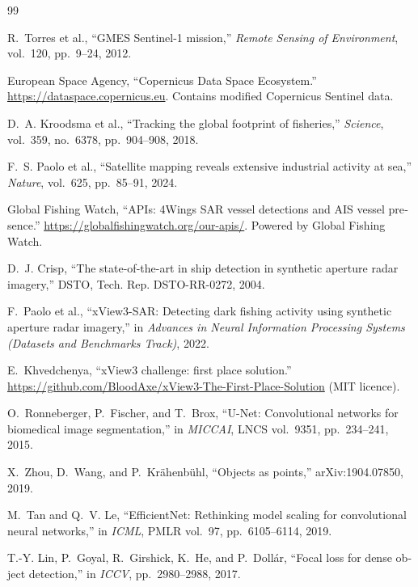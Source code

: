 \renewcommand{\bibname}{مراجع}
\begin{thebibliography}{99}
\begin{latin}

 R.~Torres et al., ``GMES Sentinel-1 mission,''
\emph{Remote Sensing of Environment}, vol.~120, pp.~9--24, 2012.

 European Space Agency, ``Copernicus Data Space Ecosystem.''
\url{https://dataspace.copernicus.eu}. Contains modified Copernicus Sentinel data.

 D.~A. Kroodsma et al., ``Tracking the global footprint of
fisheries,'' \emph{Science}, vol.~359, no.~6378, pp.~904--908, 2018.

 F.~S. Paolo et al., ``Satellite mapping reveals extensive
industrial activity at sea,'' \emph{Nature}, vol.~625, pp.~85--91, 2024.

 Global Fishing Watch, ``APIs: 4Wings SAR vessel detections and
AIS vessel presence.'' \url{https://globalfishingwatch.org/our-apis/}.
Powered by Global Fishing Watch.

 D.~J. Crisp, ``The state-of-the-art in ship detection in
synthetic aperture radar imagery,'' DSTO, Tech. Rep. DSTO-RR-0272, 2004.

 F.~Paolo et al., ``xView3-SAR: Detecting dark fishing
activity using synthetic aperture radar imagery,'' in \emph{Advances in Neural
Information Processing Systems (Datasets and Benchmarks Track)}, 2022.

 E.~Khvedchenya, ``xView3 challenge: first place solution.''
\url{https://github.com/BloodAxe/xView3-The-First-Place-Solution} (MIT licence).

 O.~Ronneberger, P.~Fischer, and T.~Brox, ``U-Net:
Convolutional networks for biomedical image segmentation,'' in \emph{MICCAI},
LNCS vol.~9351, pp.~234--241, 2015.

 X.~Zhou, D.~Wang, and P.~Kr\"ahenb\"uhl, ``Objects as
points,'' arXiv:1904.07850, 2019.

 M.~Tan and Q.~V. Le, ``EfficientNet: Rethinking model scaling
for convolutional neural networks,'' in \emph{ICML}, PMLR vol.~97,
pp.~6105--6114, 2019.

 T.-Y. Lin, P.~Goyal, R.~Girshick, K.~He, and P.~Doll\'ar,
``Focal loss for dense object detection,'' in \emph{ICCV}, pp.~2980--2988, 2017.


\end{latin}
\end{thebibliography}
